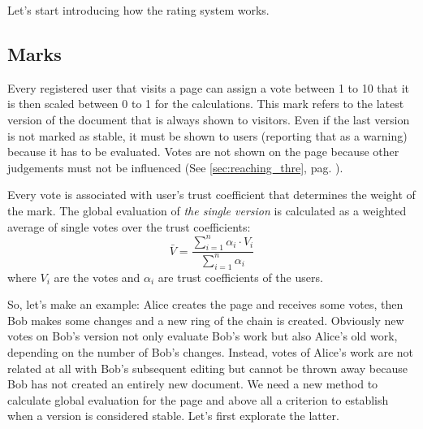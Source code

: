 \documentclass[a4paper,11pt]{article}
\begin{document}
Let's start introducing how the rating system works.

\subsection{Marks} \label{sec:marks}
Every registered user that visits a page can assign a vote between 1 to 10 
that it is then scaled between 0 to 1 for the calculations. This mark refers to the latest 
version of the document that is  always shown to visitors. Even if the last version is not 
marked as stable, it must be shown to users (reporting that as a warning) because it has 
to be evaluated. Votes are not shown on the page because other judgements must not be 
influenced (See \ref{sec:reaching_thre}, pag. \pageref{sec:reaching_thre}).

 Every vote is associated with user's trust coefficient that determines the weight of the 
 mark. The global evaluation of \emph{the single version} is calculated as a weighted 
 average of single votes over the trust coefficients:
\begin{equation} \label{eq:v_medio}
\bar{V} = \frac{\displaystyle{\sum_{i=1}^n \alpha_i \cdot V_i}}{\displaystyle{\sum_{i=1}^n \alpha_i}}
\end{equation}
where $V_i$ are the votes and $\alpha_i$ are trust coefficients of the users.

So, let's make an example: Alice creates the page and receives some votes, then Bob makes 
some changes and a new ring of the chain is created. Obviously new votes on Bob's version 
not only evaluate Bob's work but also Alice's old work, depending on the number of Bob's 
changes. Instead, votes of Alice's work are not related at all with Bob's subsequent editing 
but cannot be thrown away because Bob has not created an entirely new document. We need a 
new method to calculate global evaluation for the page and above all a criterion to 
establish when a version is considered stable. Let's first explorate the latter.
\end{document}
